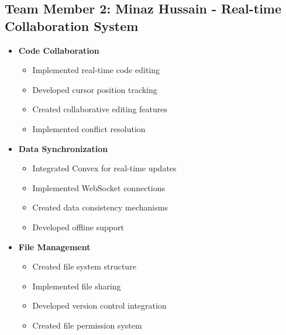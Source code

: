 \documentclass[12pt,a4paper]{report}
\begin{document}
\subsection{Team Member 2: Minaz Hussain - Real-time Collaboration System}
\begin{itemize}
    \item \textbf{Code Collaboration}
    \begin{itemize}
        \item Implemented real-time code editing
        \item Developed cursor position tracking
        \item Created collaborative editing features
        \item Implemented conflict resolution
    \end{itemize}
    
    \item \textbf{Data Synchronization}
    \begin{itemize}
        \item Integrated Convex for real-time updates
        \item Implemented WebSocket connections
        \item Created data consistency mechanisms
        \item Developed offline support
    \end{itemize}
    
    \item \textbf{File Management}
    \begin{itemize}
        \item Created file system structure
        \item Implemented file sharing
        \item Developed version control integration
        \item Created file permission system
    \end{itemize}
\end{itemize}
\end{document}
